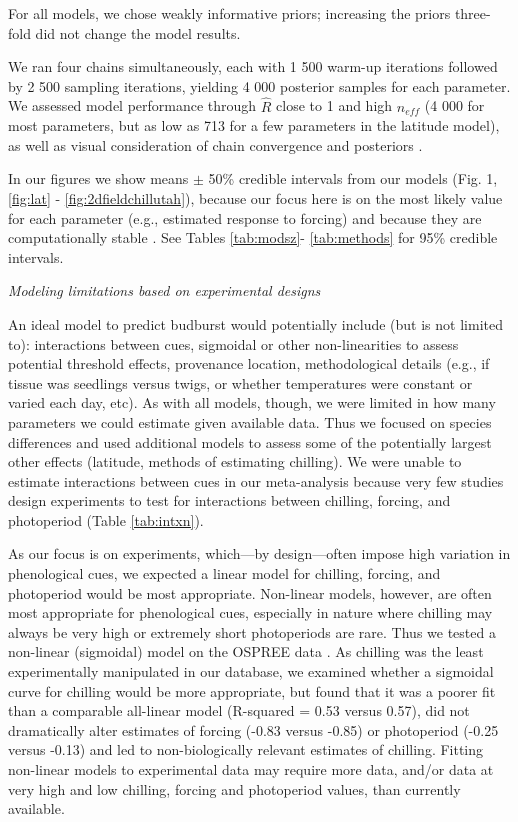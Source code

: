 \documentclass{article}
\begin{document}
\noindent For all models, we chose weakly informative priors; increasing the priors three-fold did not change the model results. 

We ran four chains simultaneously, each with 1 500 warm-up iterations followed by 2 500 sampling iterations, yielding 4 000 posterior samples for each parameter. We assessed model performance through $\hat{R}$ close to 1 and high $n_{eff}$ (4 000 for most parameters, but as low as 713 for a few parameters in the latitude model), as well as visual consideration of chain convergence and posteriors \citep{BDA}. 

In our figures  we show means $\pm$ 50\% credible intervals from our models (Fig. 1, \ref{fig:lat} - \ref{fig:2dfieldchillutah}), because our focus here is on the most likely value for each parameter (e.g., estimated response to forcing) and because they are computationally stable \citep{BDA,Carpenter:2016aa}. See Tables \ref{tab:modsz}- \ref{tab:methods} for 95\% credible intervals. 

\noindent \emph{Modeling limitations based on experimental designs}
\par An ideal model to predict budburst would potentially include (but is not limited to): interactions between cues, sigmoidal or other non-linearities to assess potential threshold effects, provenance location, methodological details (e.g., if tissue was seedlings versus twigs, or whether temperatures were constant or varied each day, etc). As with all models, though, we were limited in how many parameters we could estimate given available data. Thus we focused on species differences and used additional models to assess some of the potentially largest other effects (latitude, methods of estimating chilling). We were unable to estimate interactions between cues in our meta-analysis because very few studies design experiments to test for interactions between chilling, forcing, and photoperiod (Table \ref{tab:intxn}). 
\par As our focus is on experiments, which---by design---often impose high variation in phenological cues, we expected a linear model for chilling, forcing, and photoperiod would be most appropriate. Non-linear models, however, are often most appropriate for phenological cues, especially in nature where chilling may always be very high or extremely short photoperiods are rare. Thus we tested a non-linear (sigmoidal) model on the OSPREE data \citep{pmp}. As chilling was the least experimentally manipulated in our database, we examined whether a sigmoidal curve for chilling would be more appropriate, but found that it was a poorer fit than a comparable all-linear model (R-squared = 0.53 versus 0.57), did not dramatically alter estimates of forcing (-0.83 versus -0.85) or photoperiod (-0.25 versus -0.13) and led to non-biologically relevant estimates of chilling. Fitting non-linear models to experimental data may require more data, and/or data at very high and low chilling, forcing and photoperiod values, than currently available.
\end{document}

